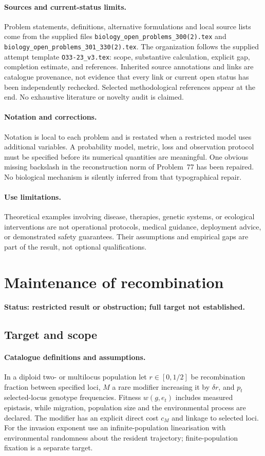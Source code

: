 \documentclass[11pt]{article}
\begin{document}
\paragraph{Sources and current-status limits.}
Problem statements, definitions, alternative formulations and local source lists
come from the supplied files
\texttt{biology\_open\_problems\_300(2).tex} and
\texttt{biology\_open\_problems\_301\_330(2).tex}.
The organization follows the supplied attempt template
\texttt{O33-23\_v3.tex}: scope, substantive calculation, explicit gap,
completion estimate, and references. Inherited source annotations and links are
catalogue provenance, not evidence that every link or current open status has
been independently rechecked. Selected methodological references appear at the
end. No exhaustive literature or novelty audit is claimed.

\paragraph{Notation and corrections.}
Notation is local to each problem and is restated when a restricted model uses
additional variables. A probability model, metric, loss and observation protocol
must be specified before its numerical quantities are meaningful. One obvious
missing backslash in the reconstruction norm of Problem~77 has been repaired.
No biological mechanism is silently inferred from that typographical repair.

\paragraph{Use limitations.}
Theoretical examples involving disease, therapies, genetic systems, or ecological
interventions are not operational protocols, medical guidance, deployment advice,
or demonstrated safety guarantees. Their assumptions and empirical gaps are part
of the result, not optional qualifications.


\section*{Maintenance of recombination}
\label{prob:145}
\noindent\textbf{Status: restricted result or obstruction; full target not established.}
\subsection{Target and scope}
\paragraph{Catalogue definitions and assumptions.}
In a diploid two- or multilocus population let $r\in[0,1/2]$ be recombination fraction between specified loci, $M$ a rare modifier increasing it by $\delta r$, and $p_t$ selected-locus genotype frequencies. Fitness $w(g,e_t)$ includes measured epistasis, while migration, population size and the environmental process are declared. The modifier has an explicit direct cost $c_M$ and linkage to selected loci. For the invasion exponent use an infinite-population linearisation with environmental randomness about the resident trajectory; finite-population fixation is a separate target.
\end{document}
